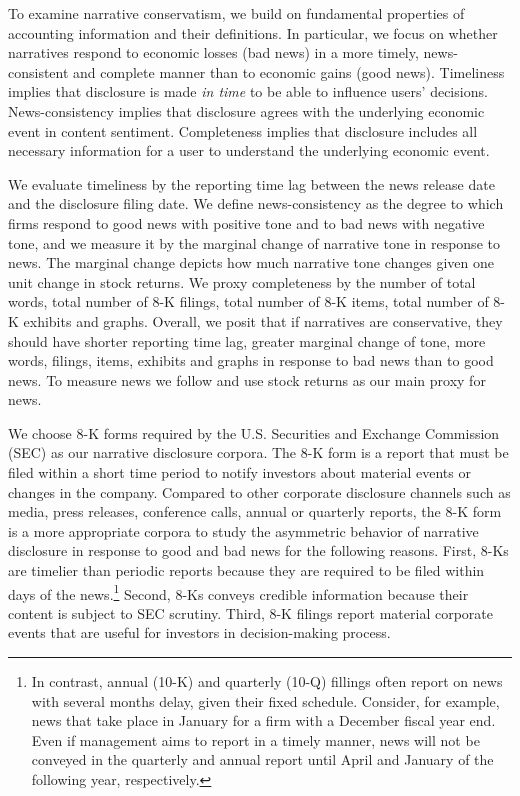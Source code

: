 \documentclass[letterpaper,12pt]{article}
\begin{document}
\begin{spacing}{1.5}
To examine narrative conservatism, we build on fundamental properties of accounting information and their definitions. In particular, we focus on whether narratives respond to economic losses (bad news) in a more timely, news-consistent and complete manner than to economic gains (good news). Timeliness implies that disclosure is made \textit{in time} to be able to influence users' decisions. News-consistency implies that disclosure agrees with the underlying economic event in content sentiment. Completeness implies that disclosure includes all necessary information for a user to understand the underlying economic event. 



We evaluate timeliness by the reporting time lag between the news release date and the disclosure filing date. We define news-consistency as the degree to which firms respond to good news with positive tone and to bad news with negative tone, and we measure it by the marginal change of narrative tone in response to news. The marginal change depicts how much narrative tone changes given one unit change in stock returns. We proxy completeness by the number of total words, total number of 8-K filings, total number of 8-K items, total number of 8-K exhibits and graphs. 
Overall, we posit that if narratives are conservative, they should have shorter reporting time lag, greater marginal change of tone, more words, filings, items, exhibits and graphs in response to bad news than to good news. To measure news we follow  and use stock returns as our main proxy for news.

We choose 8-K forms required by the U.S. Securities and Exchange Commission (SEC) as our narrative disclosure corpora. The 8-K form is a report that must be filed within a short time period to notify investors about material events or changes in the company. Compared to other corporate disclosure channels such as media, press releases, conference calls, annual or quarterly reports, the 8-K form is a more appropriate corpora to study the asymmetric behavior of narrative disclosure in response to good and bad news for the following reasons. First, 8-Ks are timelier than periodic reports because they are required to be filed within days of the news.\footnote{In contrast, annual (10-K) and quarterly (10-Q) fillings often report on news with several months delay, given their fixed schedule. Consider, for example, news that take place in January for a firm with a December fiscal year end. Even if management aims to report in a timely manner, news will not be conveyed in the quarterly and annual report until April and January of the following year, respectively.} Second, 8-Ks conveys credible information because their content is subject to SEC scrutiny. Third, 8-K filings report material corporate events that are useful for investors in decision-making process.


\end{spacing}
\end{document}
